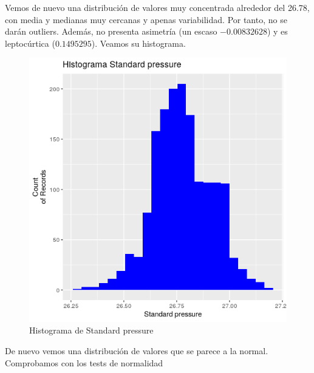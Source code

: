 Vemos de nuevo una distribución de valores muy concentrada alrededor del 26.78, con media y medianas muy cercanas y apenas variabilidad. Por tanto, no se darán outliers. Además, no presenta asimetría (un escaso $-0.00832628$) y es leptocúrtica ($0.1495295$). Veamos su histograma. 

\begin{figure}[H] %
	\centering
	\includegraphics[scale=0.7]{hist-sp.png}  %
	\caption{Histograma de Standard pressure} 
	\label{fig:hist-sp}
\end{figure}

De nuevo vemos una distribución de valores que se parece a la normal. Comprobamos con los tests de normalidad


